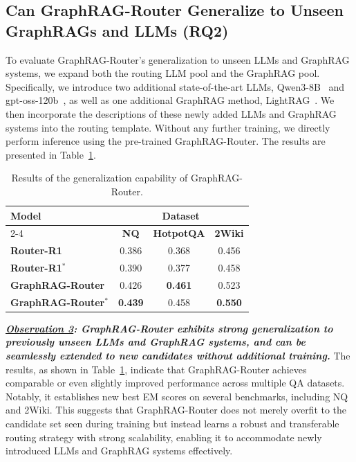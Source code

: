 \subsection{Can GraphRAG-Router Generalize to Unseen GraphRAGs and LLMs (RQ2)}
To evaluate GraphRAG-Router’s generalization to unseen LLMs and GraphRAG systems, we expand both the routing LLM pool and the GraphRAG pool. Specifically, we introduce two additional state-of-the-art LLMs, Qwen3-8B~\cite{Qwen3} and gpt-oss-120b~\cite{gptoss}, as well as one additional GraphRAG method, LightRAG~\cite{LightRAG}. We then incorporate the descriptions of these newly added LLMs and GraphRAG systems into the routing template. Without any further training, we directly perform inference using the pre-trained GraphRAG-Router. The results are presented in Table~\ref{tab:gen}.
\begin{table}[]
\centering
\footnotesize
\setlength{\tabcolsep}{5pt}
\renewcommand{\arraystretch}{1.3}
\begin{tabular}{lccc}
\toprule
\multirow{2}{*}{\textbf{Model}} & \multicolumn{3}{c}{\textbf{Dataset}} \\ \cline{2-4}
                                & \textbf{NQ} & \textbf{HotpotQA} & \textbf{2Wiki} \\ 
\midrule
\textbf{Router-R1}              & 0.386       & 0.368         & 0.456          \\
\textbf{Router-R1$^*$}          & 0.390       & 0.377         & 0.458          \\
\textbf{GraphRAG-Router}      & 0.426       & \textbf{0.461} & 0.523         \\
\textbf{GraphRAG-Router$^*$}  & \textbf{0.439} & 0.458      & \textbf{0.550} \\
\bottomrule
\end{tabular}
\caption{Results of the generalization capability of GraphRAG-Router.}
\vspace{-4mm}
\label{tab:gen}
\end{table}

\textit{\textbf{\underline{Observation 3}: GraphRAG-Router exhibits strong generalization to previously unseen LLMs and GraphRAG systems, and can be seamlessly extended to new candidates without additional training.}} The results, as shown in Table~\ref{tab:gen}, indicate that GraphRAG-Router achieves comparable or even slightly improved performance across multiple QA datasets. Notably, it establishes new best EM scores on several benchmarks, including NQ and 2Wiki. This suggests that GraphRAG-Router does not merely overfit to the candidate set seen during training but instead learns a robust and transferable routing strategy with strong scalability, enabling it to accommodate newly introduced LLMs and GraphRAG systems effectively.
